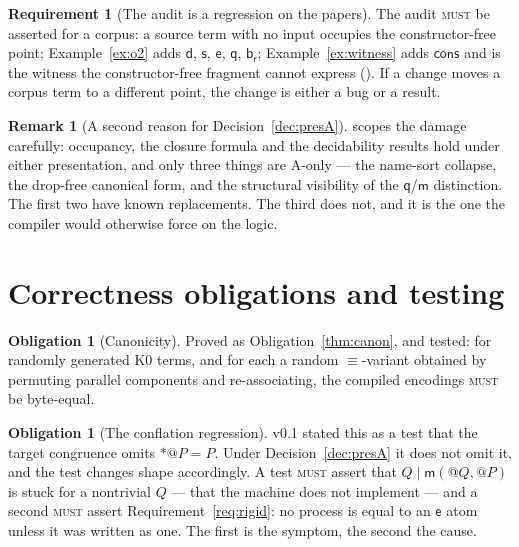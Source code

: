 \documentclass[11pt,a4paper]{article}
\makeatletter
\newcommand{\MUST}{\textsc{must}}
\newcommand{\quo}[1]{@#1}
\newcommand{\drp}[1]{{*}#1}
\newcommand{\mm}{\mathsf{m}}
\newcommand{\dd}{\mathsf{d}}
\newcommand{\br}{\mathsf{b}_{\mathsf{r}}}
\newcommand{\sy}{\mathsf{s}}
\newcommand{\ev}{\mathsf{e}}
\newcommand{\qq}{\mathsf{q}}
\newcommand{\cons}{\mathsf{cons}}
\newcommand{\scong}{\equiv}
\theoremstyle{definition}
\newtheorem{requirement}[definition]{Requirement}
\newtheorem{obligation}[definition]{Obligation}
\newtheorem{remark}[definition]{Remark}
\theoremstyle{plain}
\makeatother
\begin{document}
\begin{requirement}[The audit is a regression on the papers]\label{req:auditreg}
The audit \MUST{} be asserted for a corpus: a source term with no input
occupies the constructor-free point; Example~\ref{ex:o2} adds $\dd$, $\sy$,
$\ev$, $\qq$, $\br$; Example~\ref{ex:witness} adds $\cons$ and is the witness
the constructor-free fragment cannot express (\cite[Prop.~9.5]{draft3}). If a
change moves a corpus term to a different point, the change is either a bug or
a result.
\end{requirement}

\begin{remark}[A second reason for Decision~\ref{dec:presA}]
\cite[Rem.~2.7]{logic} scopes the damage carefully: occupancy, the closure
formula and the decidability results hold under either presentation, and only
three things are A-only --- the name-sort collapse, the drop-free canonical
form, and the structural visibility of the $\qq$/$\mm$ distinction. The first
two have known replacements. The third does not, and it is the one the
compiler would otherwise force on the logic.
\end{remark}

\section{Correctness obligations and testing}\label{sec:test}

\begin{obligation}[Canonicity]\label{obl:canon}
Proved as Obligation~\ref{thm:canon}, and tested: for randomly generated K0
terms, and for each a random $\scong$-variant obtained by permuting parallel
components and re-associating, the compiled encodings \MUST{} be byte-equal.
\end{obligation}

\begin{obligation}[The conflation regression]\label{obl:defect}
v0.1 stated this as a test that the target congruence omits
$\drp{\quo{P}} = P$. Under Decision~\ref{dec:presA} it does not omit it, and
the test changes shape accordingly. A test \MUST{} assert that
$Q \mid \mm(\quo{Q},\quo{P})$ is stuck for a nontrivial $Q$ --- that the
machine does not implement \cite[Prop.~3.5]{draft3} --- and a second \MUST{}
assert Requirement~\ref{req:rigid}: no process is equal to an $\ev$ atom
unless it was written as one. The first is the symptom, the second the cause.
\end{obligation}
\end{document}
